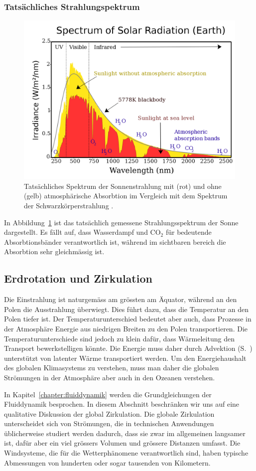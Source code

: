 \subsubsection{Tatsächliches Strahlungspektrum}
\begin{figure}
\centering
\includegraphics[width=0.7\hsize]{chapters/1/Solar_spectrum_en.png}
\caption{Tatsächliches Spektrum der Sonnenstrahlung mit (rot) und
ohne (gelb) atmosphärische Absorbtion im Vergleich mit dem Spektrum
der Schwarzkörperstrahlung \cite{skript:sunlight}.
\label{skript:strahlungsspektrum}}
\end{figure}
In Abbildung~\ref{skript:strahlungsspektrum} ist das tatsächlich gemessene
Strahlungsspektrum der Sonne dargestellt.
Es fällt auf, dass Wasserdampf und $\text{CO}_2$  für bedeutende
Absorbtionsbänder verantwortlich ist, während im sichtbaren bereich
die Absorbtion sehr gleichmässig ist.

\subsection{Erdrotation und Zirkulation}
Die Einstrahlung ist naturgemäss am grössten am Äquator, während an
den Polen die Ausstrahlung überwiegt.
Dies führt dazu, dass die Temperatur an den Polen tiefer ist.
Der Temperaturunterschied bedeutet aber auch, dass Prozesse in
der Atmosphäre Energie aus niedrigen Breiten zu den Polen
transportieren.
Die Temperaturunterschiede sind jedoch zu klein dafür, dass Wärmeleitung
den Transport bewerkstelligen könnte.
Die Energie muss daher durch Advektion (S.~\pageref{skript:advektion})
unterstützt von latenter Wärme transportiert werden.
Um den Energiehaushalt des globalen Klimasystems zu verstehen, muss
man daher die globalen Strömungen in der Atmosphäre aber auch in
den Ozeanen verstehen.

In Kapitel~\ref{chapter:fluiddynamik} werden die Grundgleichungen
der Fluiddynamik besprochen.
In diesem Abschnitt beschränken wir uns auf eine qualitative
Diskussion der global Zirkulation.
Die globale Zirkulation unterscheidet sich von Strömungen, die 
in technischen Anwendungen üblicherweise studiert werden dadurch,
dass sie zwar im allgemeinen langsamer ist, dafür aber ein viel grössers
Volumen und grössere Distanzen umfasst.
Die Windsysteme, die für die Wetterphänomene verantwortlich sind,
haben typische Abmessungen von hunderten oder sogar tausenden von
Kilometern.

